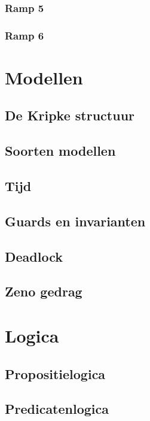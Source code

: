 \documentclass{article}
\begin{document}
\begin{description}
\subsubsection{Ramp 5}
\subsubsection{Ramp 6}

\section{Modellen}

\subsection{De Kripke structuur}

\subsection{Soorten modellen}

\subsection{Tijd}

\subsection{Guards en invarianten}

\subsection{Deadlock}

\subsection{Zeno gedrag}

\section{Logica}

\subsection{Propositielogica}

\subsection{Predicatenlogica}


\end{description}
\end{document}
